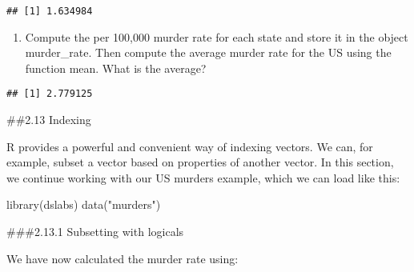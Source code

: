 \documentclass[
]{article}
\newenvironment{Shaded}{\begin{snugshade}}{\end{snugshade}}
\newcommand{\DecValTok}[1]{\textcolor[rgb]{0.00,0.00,0.81}{#1}}
\newcommand{\FunctionTok}[1]{\textcolor[rgb]{0.00,0.00,0.00}{#1}}
\newcommand{\NormalTok}[1]{#1}
\newcommand{\OtherTok}[1]{\textcolor[rgb]{0.56,0.35,0.01}{#1}}
\newcommand{\SpecialCharTok}[1]{\textcolor[rgb]{0.00,0.00,0.00}{#1}}
\newcommand{\StringTok}[1]{\textcolor[rgb]{0.31,0.60,0.02}{#1}}
\providecommand{\tightlist}{%
  \setlength{\itemsep}{0pt}\setlength{\parskip}{0pt}}
\begin{document}
\begin{verbatim}
## [1] 1.634984
\end{verbatim}

\begin{enumerate}
\def\labelenumi{\arabic{enumi}.}
\setcounter{enumi}{2}
\tightlist
\item
  Compute the per 100,000 murder rate for each state and store it in the
  object murder\_rate. Then compute the average murder rate for the US
  using the function mean. What is the average?
\end{enumerate}

\begin{Shaded}
\end{Shaded}

\begin{verbatim}
## [1] 2.779125
\end{verbatim}

\#\#2.13 Indexing

R provides a powerful and convenient way of indexing vectors. We can,
for example, subset a vector based on properties of another vector. In
this section, we continue working with our US murders example, which we
can load like this:

\begin{Shaded}
\begin{Highlighting}[]
\FunctionTok{library}\NormalTok{(dslabs)}
\FunctionTok{data}\NormalTok{(}\StringTok{"murders"}\NormalTok{)}
\end{Highlighting}
\end{Shaded}

\#\#\#2.13.1 Subsetting with logicals

We have now calculated the murder rate using:

\begin{Shaded}
\end{Shaded}
\end{document}
